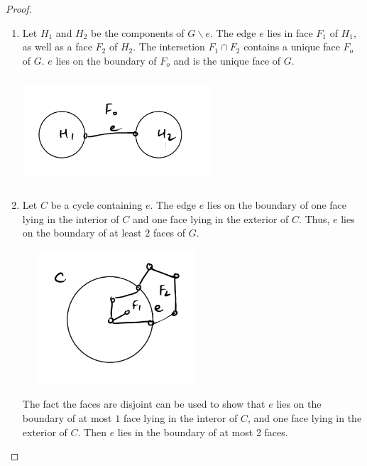\documentclass[12pt]{article}
\begin{document}
\begin{proof}
	\begin{enumerate}
		\item Let $H_{1}$ and $H_{2}$ be the components of $G\backslash e$. The edge $e$ lies in face $F_{1}$ of $H_{1}$, as well as a face $F_{2}$ of $H_{2}$.
		      The intersetion $F_{1}\cap F_{2}$ contains a unique face $F_{o}$ of $G$. $e$ lies on the boundary of $F_{o}$ and is the unique face of $G$.
		      \begin{center}
			      \includegraphics[width=7cm, height=4cm]{proof2}
		      \end{center}

		\item Let $C$ be a cycle containing $e$. The edge $e$ lies on the boundary of one face lying in the interior of $C$ and one face lying in the exterior of $C$.
		      Thus, $e$ lies on the boundary of at least $2$ faces of $G$.

		      \begin{center}
			      \includegraphics[width=7cm, height=5cm]{proof2.1}
		      \end{center}


		      The fact the faces are disjoint can be used to show that $e$ lies on the boundary of at most $1$ face lying in the interor of $C$, and one face lying in the exterior of $C$. Then $e$ lies in the boundary of at most 2 faces.

	\end{enumerate}

\end{proof}
\end{document}
